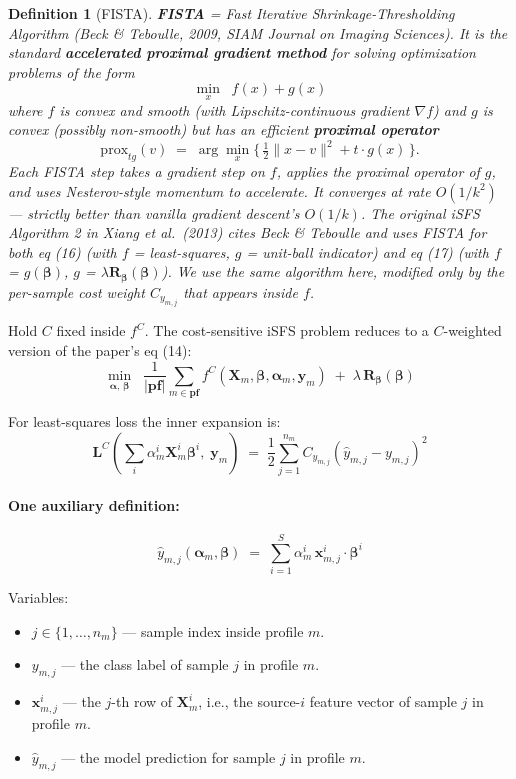 \documentclass[11pt,a4paper]{article}
\newtheorem*{definition*}{Definition}
\begin{document}
\begin{definition*}[FISTA]
\textbf{FISTA} = \emph{Fast Iterative Shrinkage-Thresholding Algorithm} (Beck \& Teboulle, 2009, \emph{SIAM Journal on Imaging Sciences}). It is the standard \textbf{accelerated proximal gradient method} for solving optimization problems of the form
\[
\min_{x}\;\;f(x) + g(x)
\]
where $f$ is convex and smooth (with Lipschitz-continuous gradient $\nabla f$) and $g$ is convex (possibly non-smooth) but has an efficient \textbf{proximal operator}
\[
\mathrm{prox}_{tg}(v) \;=\; \arg\min_{x}\Big\{\,\tfrac{1}{2}\|x - v\|^2 + t\cdot g(x)\,\Big\}.
\]
Each FISTA step takes a gradient step on $f$, applies the proximal operator of $g$, and uses Nesterov-style momentum to accelerate. It converges at rate $O(1/k^2)$ --- strictly better than vanilla gradient descent's $O(1/k)$. The original iSFS Algorithm 2 in Xiang et al.\ (2013) cites Beck \& Teboulle and uses FISTA for both eq (16) (with $f$ = least-squares, $g$ = unit-ball indicator) and eq (17) (with $f$ = $g(\boldsymbol{\beta})$, $g$ = $\lambda \mathbf{R}_{\boldsymbol{\beta}}(\boldsymbol{\beta})$). We use the same algorithm here, modified only by the per-sample cost weight $C_{y_{m,j}}$ that appears inside $f$.
\end{definition*}

Hold $C$ fixed inside $f^C$. The cost-sensitive iSFS problem reduces to a $C$-weighted version of the paper's eq (14):
\[
\min_{\boldsymbol{\alpha},\,\boldsymbol{\beta}}\;\;\frac{1}{|\mathbf{pf}|}\sum_{m \in \mathbf{pf}} f^{C}(\mathbf{X}_m,\boldsymbol{\beta},\boldsymbol{\alpha}_m,\mathbf{y}_m) \;+\; \lambda\,\mathbf{R}_{\boldsymbol{\beta}}(\boldsymbol{\beta})
\]

For least-squares loss the inner expansion is:
\[
\mathbf{L}^{C}\!\left(\sum_{i}\alpha^{i}_{m}\mathbf{X}^{i}_{m}\boldsymbol{\beta}^{i},\;\mathbf{y}_m\right) \;=\; \frac{1}{2}\sum_{j=1}^{n_m} C_{y_{m,j}}\!\left(\hat{y}_{m,j} - y_{m,j}\right)^{2}
\]

\paragraph{One auxiliary definition:}
\[
\hat{y}_{m,j}(\boldsymbol{\alpha}_m,\boldsymbol{\beta}) \;=\; \sum_{i=1}^{S}\alpha^{i}_{m}\,\mathbf{x}^{i}_{m,j}\!\cdot\boldsymbol{\beta}^{i}
\]

Variables:
\begin{itemize}[leftmargin=*,itemsep=2pt]
  \item $j \in \{1, \ldots, n_m\}$ --- sample index inside profile $m$.
  \item $y_{m,j}$ --- the class label of sample $j$ in profile $m$.
  \item $\mathbf{x}^i_{m,j}$ --- the $j$-th row of $\mathbf{X}^i_m$, i.e., the source-$i$ feature vector of sample $j$ in profile $m$.
  \item $\hat{y}_{m,j}$ --- the model prediction for sample $j$ in profile $m$.
\end{itemize}
\end{document}
